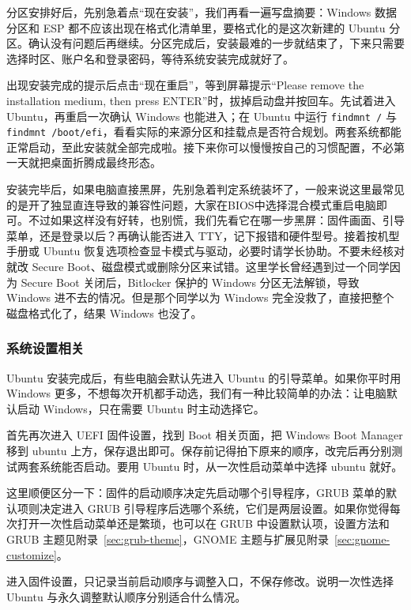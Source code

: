 分区安排好后，先别急着点“现在安装”，我们再看一遍写盘摘要：Windows 数据分区和 ESP 都不应该出现在格式化清单里，要格式化的是这次新建的 Ubuntu 分区。确认没有问题后再继续。分区完成后，安装最难的一步就结束了，下来只需要选择时区、账户名和登录密码，等待系统安装完成就好了。

出现安装完成的提示后点击“现在重启”，等到屏幕提示“Please remove the installation medium, then press ENTER”时，拔掉启动盘并按回车。先试着进入 Ubuntu，再重启一次确认 Windows 也能进入；在 Ubuntu 中运行 \texttt{findmnt /} 与 \texttt{findmnt /boot/efi}，看看实际的来源分区和挂载点是否符合规划。两套系统都能正常启动，至此安装就全部完成啦。接下来你可以慢慢按自己的习惯配置，不必第一天就把桌面折腾成最终形态。
\begin{note}
安装完毕后，如果电脑直接黑屏，先别急着判定系统装坏了，一般来说这里最常见的是开了独显直连导致的兼容性问题，大家在BIOS中选择混合模式重启电脑即可。不过如果这样没有好转，也别慌，我们先看它在哪一步黑屏：固件画面、引导菜单，还是登录以后？再确认能否进入 TTY，记下报错和硬件型号。接着按机型手册或 Ubuntu 恢复选项检查显卡模式与驱动，必要时请学长协助。不要未经核对就改 Secure Boot、磁盘模式或删除分区来试错。这里学长曾经遇到过一个同学因为 Secure Boot 关闭后，Bitlocker 保护的 Windows 分区无法解锁，导致 Windows 进不去的情况。但是那个同学以为 Windows 完全没救了，直接把整个磁盘格式化了，结果 Windows 也没了。
\end{note}

\subsubsection{系统设置相关}
\label{sec:ubuntu-boot-order}
Ubuntu 安装完成后，有些电脑会默认先进入 Ubuntu 的引导菜单。如果你平时用 Windows 更多，不想每次开机都手动选，我们有一种比较简单的办法：让电脑默认启动 Windows，只在需要 Ubuntu 时主动选择它。

首先再次进入 UEFI 固件设置，找到 Boot 相关页面，把 Windows Boot Manager 移到 ubuntu 上方，保存退出即可。保存前记得拍下原来的顺序，改完后再分别测试两套系统能否启动。要用 Ubuntu 时，从一次性启动菜单中选择 ubuntu 就好。

这里顺便区分一下：固件的启动顺序决定先启动哪个引导程序，GRUB 菜单的默认项则决定进入 GRUB 引导程序后选哪个系统，它们是两层设置。如果你觉得每次打开一次性启动菜单还是繁琐，也可以在 GRUB 中设置默认项，设置方法和 GRUB 主题见附录~\ref{sec:grub-theme}，GNOME 主题与扩展见附录~\ref{sec:gnome-customize}。
\begin{exercise}\label{ex:v1-boot-order}
进入固件设置，只记录当前启动顺序与调整入口，不保存修改。说明一次性选择 Ubuntu 与永久调整默认顺序分别适合什么情况。
\end{exercise}

